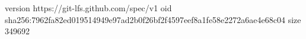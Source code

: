 version https://git-lfs.github.com/spec/v1
oid sha256:7962fa82ed019514949e97ad2b0f26bf2f4597eef8a1fe58e2272a6ae4e68c04
size 349692
